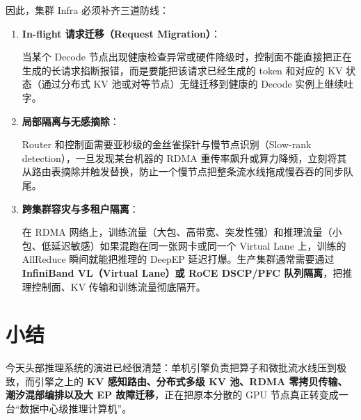 \documentclass[11pt]{article}
\begin{document}
因此，集群 Infra 必须补齐三道防线：

\begin{enumerate}
  \item \textbf{In-flight 请求迁移（Request Migration）}：

  当某个 Decode 节点出现健康检查异常或硬件降级时，控制面不能直接把正在生成的长请求掐断报错，而是要能把该请求已经生成的 token 和对应的 KV 状态（通过分布式 KV 池或对等节点）无缝迁移到健康的 Decode 实例上继续吐字。

  \item \textbf{局部隔离与无感摘除}：

  Router 和控制面需要亚秒级的金丝雀探针与慢节点识别（Slow-rank detection），一旦发现某台机器的 RDMA 重传率飙升或算力降频，立刻将其从路由表摘除并触发替换，防止一个慢节点把整条流水线拖成慢吞吞的同步队尾。

  \item \textbf{跨集群容灾与多租户隔离}：

  在 RDMA 网络上，训练流量（大包、高带宽、突发性强）和推理流量（小包、低延迟敏感）如果混跑在同一张网卡或同一个 Virtual Lane 上，训练的 AllReduce 瞬间就能把推理的 DeepEP 延迟打爆。生产集群通常需要通过 \textbf{InfiniBand VL（Virtual Lane）或 RoCE DSCP/PFC 队列隔离}，把推理控制面、KV 传输和训练流量彻底隔开。
\end{enumerate}

\section{小结}

今天头部推理系统的演进已经很清楚：单机引擎负责把算子和微批流水线压到极致，而引擎之上的 \textbf{KV 感知路由、分布式多级 KV 池、RDMA 零拷贝传输、潮汐混部编排以及大 EP 故障迁移}，正在把原本分散的 GPU 节点真正转变成一台“数据中心级推理计算机”。
\end{document}
